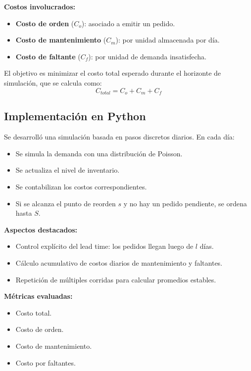 \documentclass[12pt]{article}
\begin{document}
\textbf{Costos involucrados:}
\begin{itemize}
    \item \textbf{Costo de orden} ($C_o$): asociado a emitir un pedido.
    \item \textbf{Costo de mantenimiento} ($C_m$): por unidad almacenada por día.
    \item \textbf{Costo de faltante} ($C_f$): por unidad de demanda insatisfecha.
\end{itemize}

El objetivo es minimizar el costo total esperado durante el horizonte de simulación, que se calcula como:
\[
C_{total} = C_o + C_m + C_f
\]


\subsection{Implementación en Python}

Se desarrolló una simulación basada en pasos discretos diarios. En cada día:
\begin{itemize}
    \item Se simula la demanda con una distribución de Poisson.
    \item Se actualiza el nivel de inventario.
    \item Se contabilizan los costos correspondientes.
    \item Si se alcanza el punto de reorden $s$ y no hay un pedido pendiente, se ordena hasta $S$.
\end{itemize}

\textbf{Aspectos destacados:}
\begin{itemize}
    \item Control explícito del lead time: los pedidos llegan luego de $l$ días.
    \item Cálculo acumulativo de costos diarios de mantenimiento y faltantes.
    \item Repetición de múltiples corridas para calcular promedios estables.
\end{itemize}

\textbf{Métricas evaluadas:}
\begin{itemize}
    \item Costo total.
    \item Costo de orden.
    \item Costo de mantenimiento.
    \item Costo por faltantes.
\end{itemize}
\end{document}
